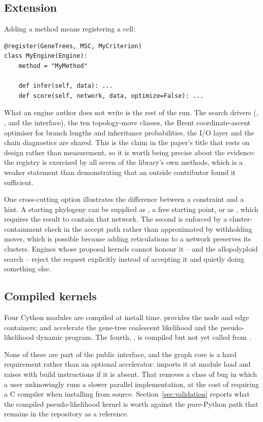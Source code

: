 \subsection{Extension}

Adding a method means registering a cell:

\begin{lstlisting}
@register(GeneTrees, MSC, MyCriterion)
class MyEngine(Engine):
    method = "MyMethod"

    def infer(self, data): ...
    def score(self, network, data, optimize=False): ...
\end{lstlisting}

What an engine author does not write is the rest of the run. The search drivers
(, , and the 
interface), the ten topology-move classes, the Brent coordinate-ascent
optimiser for branch lengths and inheritance probabilities, the I/O layer and
the chain diagnostics are shared. This is the claim in the paper's title that
rests on design rather than measurement, so it is worth being precise about the
evidence: the registry is exercised by all seven of the library's own methods,
which is a weaker statement than demonstrating that an outside contributor
found it sufficient.

One cross-cutting option illustrates the difference between a constraint and a
hint. A starting phylogeny can be supplied as , a free
starting point, or as , which requires the
result to contain that network. The second is enforced by a cluster-containment
check in the accept path rather than approximated by withholding moves, which
is possible because adding reticulations to a network preserves its clusters.
Engines whose proposal kernels cannot honour it --  and the
allopolyploid search -- reject the request explicitly instead of accepting it
and quietly doing something else.

\subsection{Compiled kernels}

Four Cython modules are compiled at install time.  provides
the node and edge containers;  and 
accelerate the gene-tree coalescent likelihood and the pseudo-likelihood
dynamic program. The fourth, , is compiled but not yet
called from .

None of these are part of the public interface, and the graph core is a hard
requirement rather than an optional accelerator:  imports it at
module load and raises with build instructions if it is absent. That removes a
class of bug in which a user unknowingly runs a slower parallel implementation,
at the cost of requiring a C compiler when installing from source.
Section~\ref{sec:validation} reports what the compiled pseudo-likelihood kernel
is worth against the pure-Python path that remains in the repository as a
reference.
